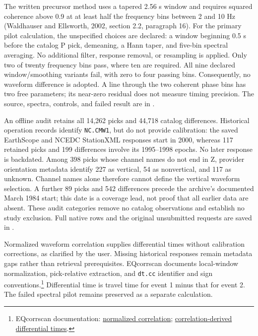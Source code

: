 The written precursor method uses a tapered 2.56 s window and requires
squared coherence above 0.9 at at least half the frequency bins between
2 and 10 Hz (Waldhauser and Ellsworth, 2002, section 2.2, paragraph 16).
For the primary pilot calculation, the unspecified choices are declared:
a window beginning 0.5 s before the catalog P pick, demeaning, a Hann taper,
and five-bin spectral averaging. No additional filter, response removal,
or resampling is applied. Only two of twenty frequency bins pass, where ten
are required. All nine declared window/smoothing variants fail, with zero
to four passing bins. Consequently, no waveform difference is adopted.
A line through the two coherent phase bins has two free parameters; its
near-zero residual does not measure timing precision. The source, spectra,
controls, and failed result are in
.

An offline audit retains all 14,262 picks and 44,718 catalog differences.
Historical operation records identify \texttt{NC.CMW1}, but do not provide
calibration: the saved EarthScope and NCEDC StationXML responses start in
2000, whereas 117 retained picks and 199 differences involve its 1995--1998
epochs. No later response is backdated. Among 398 picks whose channel names
do not end in Z, provider orientation metadata identify 227 as vertical,
54 as nonvertical, and 117 as unknown. Channel names alone therefore cannot
define the vertical waveform selection. A further 89 picks and 542
differences precede the archive's documented March 1984 start; this date
is a coverage lead, not proof that all earlier data are absent. These audit
categories remove no catalog observations and establish no study exclusion.
Full native rows and the original unsubmitted requests are saved in
.

Normalized waveform correlation supplies differential times without
calibration corrections, as clarified by the user. Missing historical responses
remain metadata gaps rather than retrieval prerequisites.
EQcorrscan documents local-window normalization, pick-relative extraction,
and \texttt{dt.cc} identifier and sign conventions.\footnote{EQcorrscan documentation:
\href{https://eqcorrscan.readthedocs.io/en/latest/submodules/utils.correlate.html}{normalized correlation};
\href{https://eqcorrscan.readthedocs.io/en/latest/submodules/autogen/eqcorrscan.utils.catalog_to_dd.write_correlations.html}{correlation-derived differential times}.}
Differential time is travel time for event 1 minus that for event 2.
The failed spectral pilot remains preserved as a separate calculation.

